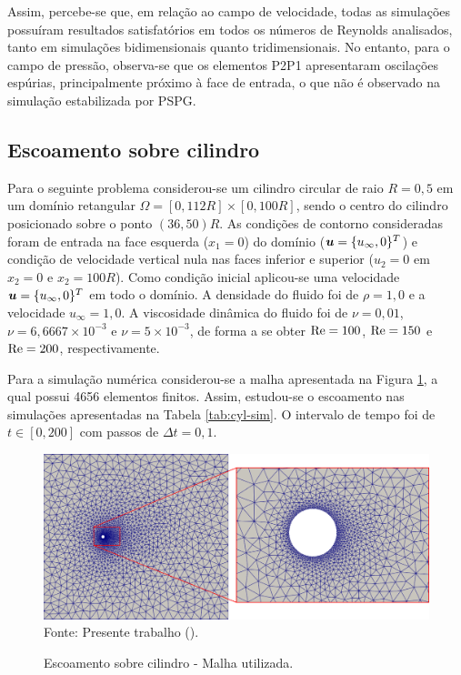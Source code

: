 Assim, percebe-se que, em relação ao campo de velocidade, todas as simulações possuíram resultados satisfatórios em todos os números de Reynolds analisados, tanto em simulações bidimensionais quanto tridimensionais. No entanto, para o campo de pressão, observa-se que os elementos P2P1 apresentaram oscilações espúrias, principalmente próximo à face de entrada, o que não é observado na simulação estabilizada por PSPG.

\subsection{Escoamento sobre cilindro} \label{ex:cylinder}

Para o seguinte problema considerou-se um cilindro circular de raio $R=0,5$ em um domínio retangular $\Omega=[0,112R]\times[0,100R]$, sendo o centro do cilindro posicionado sobre o ponto $(36,50)R$. As condições de contorno consideradas foram de entrada na face esquerda ($x_1=0$) do domínio ($\boldsymbol{u}=\{u_\infty,0\}^T$) e condição de velocidade vertical nula nas faces inferior e superior ($u_2=0$ em $x_2=0$ e $x_2=100R$). Como condição inicial aplicou-se uma velocidade $\boldsymbol{u}=\{u_\infty,0\}^T$ em todo o domínio. A densidade do fluido foi de $\rho=1,0$ e a velocidade $u_\infty=1,0$. A viscosidade dinâmica do fluido foi de $\nu=0,01$, $\nu=6,6667\times10^{-3}$ e $\nu=5\times10^{-3}$, de forma a se obter $\mathrm{Re}=100$, $\mathrm{Re}=150$ e $\mathrm{Re}=200$, respectivamente.

Para a simulação numérica considerou-se a malha apresentada na Figura \ref{fig:cyl-mesh}, a qual possui 4656 elementos finitos. Assim, estudou-se o escoamento nas simulações apresentadas na Tabela \ref{tab:cyl-sim}. O intervalo de tempo foi de $t\in[0,200]$ com passos de $\Delta t=0,1$.

\begin{figure}[h!]
    \centering
    \caption{Escoamento sobre cilindro - Malha utilizada.}
    \includegraphics[width=\linewidth]{Figuras/cylinder/analise2/mesh.png}
    \\Fonte: Presente trabalho (\the\year).
    \label{fig:cyl-mesh}
\end{figure}

